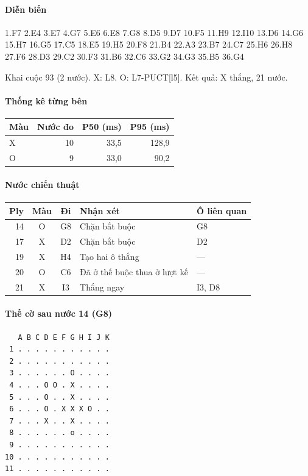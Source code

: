 \paragraph{Diễn biến}
{\footnotesize 1.F7 2.E4 3.E7 4.G7 5.E6 6.E8 7.G8 8.D5 9.D7 10.F5 11.H9 12.I10 13.D6 14.G6 15.H7 16.G5 17.C5 18.E5 19.H5 20.F8 21.B4 22.A3 23.B7 24.C7 25.H6 26.H8 27.F6 28.D3 29.C2 30.F3 31.B6 32.C6 33.G2 34.G3 35.B5 36.G4\par}
Khai cuộc 93 (2 nước). X: L8. O: L7-PUCT[l5]. Kết quả: X thắng, 21 nước.
\paragraph{Thống kê từng bên}
\begin{center}\small
\begin{tabular}{@{}lrrr@{}}
\toprule
Màu & Nước đo & P50 (ms) & P95 (ms) \\
\midrule
X & 10 & 33,5 & 128,9 \\
O & 9 & 33,0 & 90,2 \\
\bottomrule
\end{tabular}
\end{center}
\paragraph{Nước chiến thuật}
\begin{center}\small
\begin{tabular}{@{}rccll@{}}
\toprule
Ply & Màu & Đi & Nhận xét & Ô liên quan \\
\midrule
14 & O & G8 & Chặn bắt buộc & G8 \\
17 & X & D2 & Chặn bắt buộc & D2 \\
19 & X & H4 & Tạo hai ô thắng & — \\
20 & O & C6 & Đã ở thế buộc thua ở lượt kế & — \\
21 & X & I3 & Thắng ngay & I3, D8 \\
\bottomrule
\end{tabular}
\end{center}
\paragraph{Thế cờ sau nước 14 (G8)}
\begin{verbatim}
   A B C D E F G H I J K
 1 . . . . . . . . . . .
 2 . . . . . . . . . . .
 3 . . . . . . O . . . .
 4 . . . O O . X . . . .
 5 . . . O . . X . . . .
 6 . . . O . X X X O . .
 7 . . . X . . X . . . .
 8 . . . . . . o . . . .
 9 . . . . . . . . . . .
10 . . . . . . . . . . .
11 . . . . . . . . . . .
\end{verbatim}
